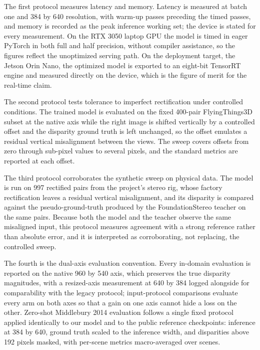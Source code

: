 The first protocol measures latency and memory. Latency is measured at
batch one and 384 by 640 resolution, with warm-up passes preceding the
timed passes, and memory is recorded as the peak inference working set;
the device is stated for every measurement. On the RTX 3050 laptop GPU
the model is timed in eager PyTorch in both full and half precision,
without compiler assistance, so the figures reflect the unoptimized
serving path. On the deployment target, the Jetson Orin Nano, the
optimized model is exported to an eight-bit TensorRT engine and measured
directly on the device, which is the figure of merit for the real-time
claim.

The second protocol tests tolerance to imperfect rectification under
controlled conditions. The trained model is evaluated on the fixed
400-pair FlyingThings3D subset at the native axis while the right image
is shifted vertically by a controlled offset and the disparity ground
truth is left unchanged, so the offset emulates a residual vertical
misalignment between the views. The sweep covers offsets from zero
through sub-pixel values to several pixels, and the standard metrics are
reported at each offset.

The third protocol corroborates the synthetic sweep on physical data.
The model is run on 997 rectified pairs from the project's stereo rig,
whose factory rectification leaves a residual vertical misalignment, and
its disparity is compared against the pseudo-ground-truth produced by the
FoundationStereo teacher on the same pairs. Because both the model and
the teacher observe the same misaligned input, this protocol measures
agreement with a strong reference rather than absolute error, and it is
interpreted as corroborating, not replacing, the controlled sweep.

The fourth is the dual-axis evaluation convention. Every in-domain
evaluation is reported on the native 960 by 540 axis, which preserves the
true disparity magnitudes, with a resized-axis measurement at 640 by 384
logged alongside for comparability with the legacy protocol; input-protocol
comparisons evaluate every arm on both axes so that a gain on one axis
cannot hide a loss on the other. Zero-shot Middlebury 2014 evaluation
follows a single fixed protocol applied identically to our model and to
the public reference checkpoints: inference at 384 by 640, ground truth
scaled to the inference width, and disparities above 192 pixels masked,
with per-scene metrics macro-averaged over scenes.

\FloatBarrier
